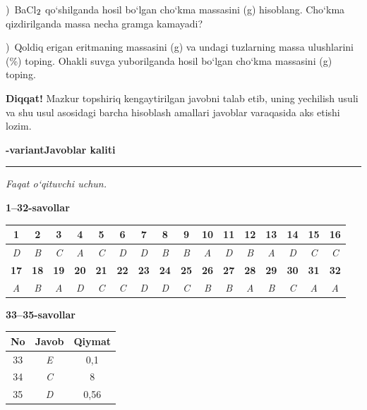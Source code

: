\documentclass[11pt,a4paper]{article}
\renewcommand{\textsubscript}[1]{\ensuremath{_{\text{\fontsize{8}{8}\selectfont #1}}}}
\newcommand{\qsep}{\par\vspace{13pt}}
\newcommand{\diqqat}[1]{\par\smallskip\noindent\textbf{Diqqat!} #1\par\medskip}
\begin{document}
)\ BaCl\textsubscript{2} qo`shilganda hosil bo`lgan cho`kma massasini (g) hisoblang. Cho`kma qizdirilganda massa necha gramga kamayadi?\par
{})\ Qoldiq erigan eritmaning massasini (g) va undagi tuzlarning massa ulushlarini (\%) toping. Ohakli suvga yuborilganda hosil bo`lgan cho`kma massasini (g) toping.\par
\diqqat{Mazkur topshiriq kengaytirilgan javobni talab etib, uning yechilish usuli va shu usul asosidagi barcha hisoblash amallari javoblar varaqasida aks etishi lozim.}\qsep
\newpage
\noindent\textbf{\fontsize{13}{15}-variant}\hfill \textbf{Javoblar kaliti}\par\smallskip\hrule\smallskip
\textit{Faqat o`qituvchi uchun.}\par\medskip
\noindent\textbf{1--32-savollar}\par\smallskip
\noindent\begin{tabular}{|c|c|c|c|c|c|c|c|c|c|c|c|c|c|c|c|}\hline
\textbf{1} & \textbf{2} & \textbf{3} & \textbf{4} & \textbf{5} & \textbf{6} & \textbf{7} & \textbf{8} & \textbf{9} & \textbf{10} & \textbf{11} & \textbf{12} & \textbf{13} & \textbf{14} & \textbf{15} & \textbf{16}\\\hline
\textsl{D} & \textsl{B} & \textsl{C} & \textsl{A} & \textsl{C} & \textsl{D} & \textsl{D} & \textsl{B} & \textsl{B} & \textsl{A} & \textsl{D} & \textsl{B} & \textsl{A} & \textsl{D} & \textsl{C} & \textsl{C}\\\hline
\textbf{17} & \textbf{18} & \textbf{19} & \textbf{20} & \textbf{21} & \textbf{22} & \textbf{23} & \textbf{24} & \textbf{25} & \textbf{26} & \textbf{27} & \textbf{28} & \textbf{29} & \textbf{30} & \textbf{31} & \textbf{32}\\\hline
\textsl{A} & \textsl{B} & \textsl{A} & \textsl{D} & \textsl{C} & \textsl{C} & \textsl{D} & \textsl{D} & \textsl{C} & \textsl{B} & \textsl{B} & \textsl{A} & \textsl{B} & \textsl{C} & \textsl{A} & \textsl{A}\\\hline
\end{tabular}\par\medskip
\noindent\textbf{33--35-savollar}\par\smallskip
\noindent\begin{tabular}{|c|c|c|}\hline \textbf{No} & \textbf{Javob} & \textbf{Qiymat}\\\hline
33 & \textsl{E} & 0,1\\\hline
34 & \textsl{C} & 8\\\hline
35 & \textsl{D} & 0,56\\\hline
\end{tabular}\par\medskip
\end{document}

